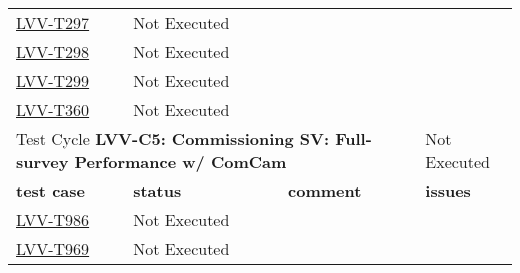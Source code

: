 \documentclass[DM,lsstdraft,STR,toc]{lsstdoc}
\begin{document}
\begin{longtable}{p{2cm}p{2.5cm}p{9cm}p{2.5cm}}
\begin{minipage}[]{9cm}
    \medskip
    \end{minipage}
    &
    \\\hline
\href{https://jira.lsstcorp.org/secure/Tests.jspa#/testCase/LVV-T297}{LVV-T297}
    & Not Executed &
    \begin{minipage}[]{9cm}
    \smallskip
    
    \medskip
    \end{minipage}
    &
    \\\hline
\href{https://jira.lsstcorp.org/secure/Tests.jspa#/testCase/LVV-T298}{LVV-T298}
    & Not Executed &
    \begin{minipage}[]{9cm}
    \smallskip
    
    \medskip
    \end{minipage}
    &
    \\\hline
\href{https://jira.lsstcorp.org/secure/Tests.jspa#/testCase/LVV-T299}{LVV-T299}
    & Not Executed &
    \begin{minipage}[]{9cm}
    \smallskip
    
    \medskip
    \end{minipage}
    &
    \\\hline
\href{https://jira.lsstcorp.org/secure/Tests.jspa#/testCase/LVV-T360}{LVV-T360}
    & Not Executed &
    \begin{minipage}[]{9cm}
    \smallskip
    
    \medskip
    \end{minipage}
    &
    \\\hline

  \multicolumn{3}{l}{ Test Cycle {\bf LVV-C5: Commissioning SV: Full-survey Performance w/ ComCam
 }} & Not Executed \\\hline

  {\bf \footnotesize test case} & {\bf \footnotesize status} & {\bf \footnotesize comment} & {\bf \footnotesize issues} \\\toprule

\href{https://jira.lsstcorp.org/secure/Tests.jspa#/testCase/LVV-T986}{LVV-T986}
    & Not Executed &
    \begin{minipage}[]{9cm}
    \smallskip
    
    \medskip
    \end{minipage}
    &
    \\\hline
\href{https://jira.lsstcorp.org/secure/Tests.jspa#/testCase/LVV-T969}{LVV-T969}
    & Not Executed &
    \begin{minipage}[]{9cm}
    \smallskip
    

\end{minipage}
\end{longtable}
\end{document}
